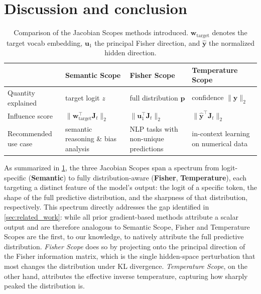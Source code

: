 \documentclass{article}
\begin{document}
\section{Discussion and conclusion}
\label{sec:discussion}


\begin{table}[h]
  \centering
  \caption{
  Comparison of the Jacobian Scopes methods introduced.
  $\bm{w}_{\mathrm{target}}$ denotes the target vocab embedding, 
  $\bm{u}_1$ the principal Fisher direction, and $\hat{\bm{y}}$ the normalized hidden direction.
  }
  
  \begin{tabular}{l>{\centering\arraybackslash}p{3cm}>{\centering\arraybackslash}p{3cm}>{\centering\arraybackslash}p{3cm}}
  \hline
  & \textbf{Semantic Scope} & \textbf{Fisher Scope} & \textbf{Temperature Scope} \\
  \hline
  Quantity explained
  & target logit $z$
  & full distribution $\bm p$
  & confidence $\|\bm{y}\|_2$ \\
  
  Influence score
  & $\|\bm{w}_{\mathrm{target}}^\intercal \bm{J}_t\|_2$ 
  & $\|\bm{u}_1^\intercal \bm{J}_t\|_2$ 
  & $\|\hat{\bm{y}}^\intercal\bm{J}_t\|_2$ \\
  
  Recommended use case
  & semantic reasoning \& bias analysis
  & NLP tasks with non-unique predictions
  & in-context learning on numerical data \\
  \hline
  \end{tabular}
  \label{tab:jacobian_scopes_summary}
\end{table}

As summarized in \cref{tab:jacobian_scopes_summary}, the three Jacobian Scopes span a spectrum from logit-specific (\textbf{Semantic}) to fully distribution-aware (\textbf{Fisher}, \textbf{Temperature}), each targeting a distinct feature of the model's output: the logit of a specific token, the shape of the full predictive distribution, and the sharpness of that distribution, respectively.
This spectrum directly addresses the gap identified in \cref{sec:related_work}: while all prior gradient-based methods attribute a scalar output and are therefore analogous to Semantic Scope, Fisher and Temperature Scopes are the first, to our knowledge, to natively attribute the full predictive distribution.
\emph{Fisher Scope} does so by projecting onto the principal direction of the Fisher information matrix, which is the single hidden-space perturbation that most changes the distribution under KL divergence. \emph{Temperature Scope}, on the other hand, attributes the effective inverse temperature, capturing how sharply peaked the distribution is.
\end{document}
